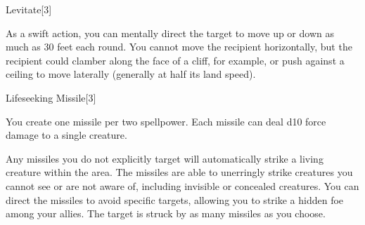 \begin{spellsection}{Levitate}[3]
    \begin{spellheader}
    \end{spellheader}
    \begin{spellcontent}
        \begin{spelltargetinginfo}
            \spellrng{\rngclose}
        \end{spelltargetinginfo}
        \begin{spelleffects}
            \spelleffect As a swift action, you can mentally direct the target to move up or down as much as 30 feet each round. You cannot move the recipient horizontally, but the recipient could clamber along the face of a cliff, for example, or push against a ceiling to move laterally (generally at half its land speed).
            \spelldur \durshort \dismissable
        \end{spelleffects}
    \end{spellcontent}
    \begin{spellfooter}
        \miscastrandom
    \end{spellfooter}
\end{spellsection}

\begin{spellsection}{Lifeseeking Missile}[3]
    \begin{spellheader}
    \end{spellheader}
    \begin{spellcontent}
        \begin{spelltargetinginfo}
        \end{spelltargetinginfo}
        \begin{spelleffects}
            \spellspecial You create one missile per two spellpower. Each missile can deal d10 force damage to a single creature.

            Any missiles you do not explicitly target will automatically strike a living creature within the area. The missiles are able to unerringly strike creatures you cannot see or are not aware of, including invisible or concealed creatures. You can direct the missiles to avoid specific targets, allowing you to strike a hidden foe among your allies.
            \spelleffect The target is struck by as many missiles as you choose.
        \end{spelleffects}
    \end{spellcontent}
    \begin{spellfooter}
        \miscastexplode
    \end{spellfooter}
\end{spellsection}


